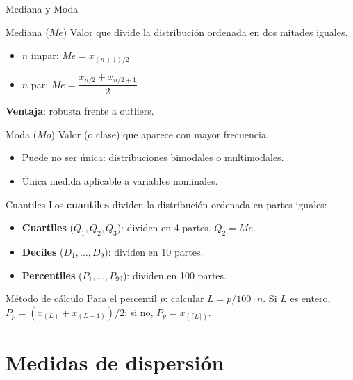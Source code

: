 \documentclass[aspectratio=169]{beamer}
\begin{document}
\begin{frame}{Mediana y Moda}
  \begin{block}{Mediana ($Me$)}
    Valor que divide la distribución ordenada en dos mitades iguales.
    \begin{itemize}
      \item $n$ impar: $Me = x_{(n+1)/2}$
      \item $n$ par: $Me = \dfrac{x_{n/2} + x_{n/2+1}}{2}$
    \end{itemize}
    \textbf{Ventaja}: robusta frente a outliers.
  \end{block}
  \bigskip
  \begin{block}{Moda ($Mo$)}
    Valor (o clase) que aparece con mayor frecuencia.
    \begin{itemize}
      \item Puede no ser única: distribuciones bimodales o multimodales.
      \item Única medida aplicable a variables nominales.
    \end{itemize}
  \end{block}
\end{frame}

\begin{frame}{Cuantiles}
  Los \textbf{cuantiles} dividen la distribución ordenada en partes iguales:
  \bigskip
  \begin{itemize}
    \item \textbf{Cuartiles} ($Q_1, Q_2, Q_3$): dividen en 4 partes. $Q_2 = Me$.
    \item \textbf{Deciles} ($D_1,\ldots,D_9$): dividen en 10 partes.
    \item \textbf{Percentiles} ($P_1,\ldots,P_{99}$): dividen en 100 partes.
  \end{itemize}
  \bigskip
  \begin{alertblock}{Método de cálculo}
    Para el percentil $p$: calcular $L = p/100 \cdot n$. Si $L$ es entero, $P_p = (x_{(L)} + x_{(L+1)})/2$; si no, $P_p = x_{(\lceil L \rceil)}$.
  \end{alertblock}
\end{frame}

\section{Medidas de dispersión}
\end{document}
